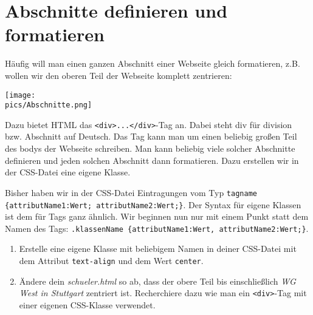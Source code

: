 \section{Abschnitte definieren und formatieren}
Häufig will man einen ganzen Abschnitt einer Webseite gleich formatieren, z.B. wollen wir den oberen Teil der Webseite komplett zentrieren:
\begin{minipage}[t]{\textwidth}
    \texttt{[image: \\pics/Abschnitte.png]}
\end{minipage}
Dazu bietet HTML das \lstinline|<div>...</div>|-Tag an. Dabei steht div für division bzw. Abschnitt auf Deutsch. Das Tag kann man um einen beliebig großen Teil des bodys der Webseite schreiben. Man kann beliebig viele solcher Abschnitte definieren und jeden solchen Abschnitt dann formatieren. Dazu erstellen wir in der CSS-Datei eine eigene Klasse.

Bisher haben wir in der CSS-Datei Eintragungen vom Typ \lstinline|tagname {attributName1:Wert; attributName2:Wert;}|. Der Syntax für eigene Klassen ist dem für Tags ganz ähnlich. Wir beginnen nun nur mit einem Punkt statt dem Namen des Tags: \lstinline|.klassenName {attributName1:Wert, attributName2:Wert;}|.

\begin{Exercise}[title=, label=Abschnitte]
    \begin{enumerate}
        \item Erstelle eine eigene Klasse mit beliebigem Namen in deiner CSS-Datei mit dem Attribut \lstinline|text-align| und dem Wert \lstinline|center|.
        \item Ändere dein \textit{schueler.html} so ab, dass der obere Teil bis einschließlich \textit{WG West in Stuttgart} zentriert ist. Recherchiere dazu wie man ein \lstinline|<div>|-Tag mit einer eigenen CSS-Klasse verwendet.
    \end{enumerate}
\end{Exercise}
